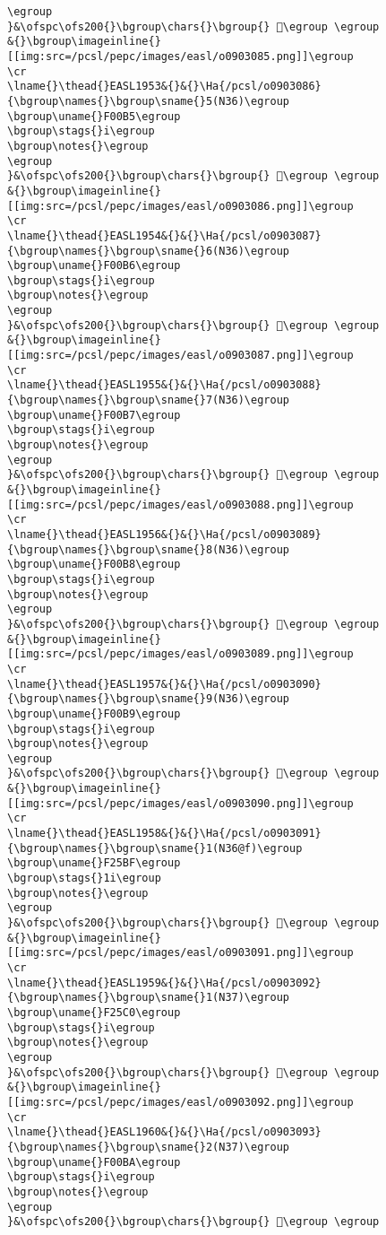 \begin{verbatim}
\egroup
}&\ofspc\ofs200{}\bgroup\chars{}\bgroup{} 󲙖\egroup \egroup
&{}\bgroup\imageinline{}[[img:src=/pcsl/pepc/images/easl/o0903085.png]]\egroup
\cr
\lname{}\thead{}EASL1953&{}&{}\Ha{/pcsl/o0903086}{\bgroup\names{}\bgroup\sname{}5(N36)\egroup
\bgroup\uname{}F00B5\egroup
\bgroup\stags{}i\egroup
\bgroup\notes{}\egroup
\egroup
}&\ofspc\ofs200{}\bgroup\chars{}\bgroup{} 󰂵\egroup \egroup
&{}\bgroup\imageinline{}[[img:src=/pcsl/pepc/images/easl/o0903086.png]]\egroup
\cr
\lname{}\thead{}EASL1954&{}&{}\Ha{/pcsl/o0903087}{\bgroup\names{}\bgroup\sname{}6(N36)\egroup
\bgroup\uname{}F00B6\egroup
\bgroup\stags{}i\egroup
\bgroup\notes{}\egroup
\egroup
}&\ofspc\ofs200{}\bgroup\chars{}\bgroup{} 󰂶\egroup \egroup
&{}\bgroup\imageinline{}[[img:src=/pcsl/pepc/images/easl/o0903087.png]]\egroup
\cr
\lname{}\thead{}EASL1955&{}&{}\Ha{/pcsl/o0903088}{\bgroup\names{}\bgroup\sname{}7(N36)\egroup
\bgroup\uname{}F00B7\egroup
\bgroup\stags{}i\egroup
\bgroup\notes{}\egroup
\egroup
}&\ofspc\ofs200{}\bgroup\chars{}\bgroup{} 󰂷\egroup \egroup
&{}\bgroup\imageinline{}[[img:src=/pcsl/pepc/images/easl/o0903088.png]]\egroup
\cr
\lname{}\thead{}EASL1956&{}&{}\Ha{/pcsl/o0903089}{\bgroup\names{}\bgroup\sname{}8(N36)\egroup
\bgroup\uname{}F00B8\egroup
\bgroup\stags{}i\egroup
\bgroup\notes{}\egroup
\egroup
}&\ofspc\ofs200{}\bgroup\chars{}\bgroup{} 󰂸\egroup \egroup
&{}\bgroup\imageinline{}[[img:src=/pcsl/pepc/images/easl/o0903089.png]]\egroup
\cr
\lname{}\thead{}EASL1957&{}&{}\Ha{/pcsl/o0903090}{\bgroup\names{}\bgroup\sname{}9(N36)\egroup
\bgroup\uname{}F00B9\egroup
\bgroup\stags{}i\egroup
\bgroup\notes{}\egroup
\egroup
}&\ofspc\ofs200{}\bgroup\chars{}\bgroup{} 󰂹\egroup \egroup
&{}\bgroup\imageinline{}[[img:src=/pcsl/pepc/images/easl/o0903090.png]]\egroup
\cr
\lname{}\thead{}EASL1958&{}&{}\Ha{/pcsl/o0903091}{\bgroup\names{}\bgroup\sname{}1(N36@f)\egroup
\bgroup\uname{}F25BF\egroup
\bgroup\stags{}1i\egroup
\bgroup\notes{}\egroup
\egroup
}&\ofspc\ofs200{}\bgroup\chars{}\bgroup{} 󲖿\egroup \egroup
&{}\bgroup\imageinline{}[[img:src=/pcsl/pepc/images/easl/o0903091.png]]\egroup
\cr
\lname{}\thead{}EASL1959&{}&{}\Ha{/pcsl/o0903092}{\bgroup\names{}\bgroup\sname{}1(N37)\egroup
\bgroup\uname{}F25C0\egroup
\bgroup\stags{}i\egroup
\bgroup\notes{}\egroup
\egroup
}&\ofspc\ofs200{}\bgroup\chars{}\bgroup{} 󲗀\egroup \egroup
&{}\bgroup\imageinline{}[[img:src=/pcsl/pepc/images/easl/o0903092.png]]\egroup
\cr
\lname{}\thead{}EASL1960&{}&{}\Ha{/pcsl/o0903093}{\bgroup\names{}\bgroup\sname{}2(N37)\egroup
\bgroup\uname{}F00BA\egroup
\bgroup\stags{}i\egroup
\bgroup\notes{}\egroup
\egroup
}&\ofspc\ofs200{}\bgroup\chars{}\bgroup{} 󰂺\egroup \egroup

\end{verbatim}
